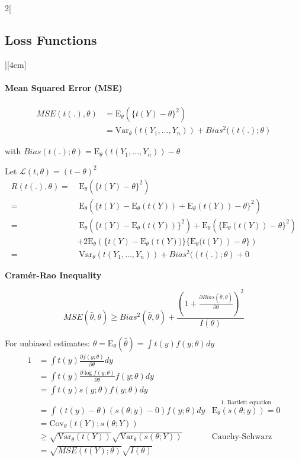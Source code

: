 \documentclass[8pt]{extarticle}
\begin{document}
\begin{multicols}{2}[\subsection{Loss Functions}][4cm]
\paragraph{Mean Squared Error (MSE)}
\begin{align*}
MSE(t(.), \theta) &= \mathrm{E}_\theta\left(\{t(Y)-\theta\}^2\right) \\
&=\mathrm{Var}_\theta\left(t(Y_1,...,Y_n)\right) + Bias^2((t(.); \theta)
\end{align*}

\noindent with $Bias(t(.);\theta) = \mathrm{E}_\theta\left(t(Y_1,...,Y_n)\right)-\theta$

\begin{Proof}
Let $\mathcal{L}(t, \theta) = (t-\theta)^2$
\begin{align*}
R(t(.), \theta) = &\: \mathrm{E}_\theta (\{t(Y) -\theta\}^2) \\
= &\: \mathrm{E}_\theta (\{t(Y) - \mathrm{E}_\theta(t(Y)) + \mathrm{E}_\theta(t(Y))-\theta\}^2) \\
= &\: \mathrm{E}_\theta (\{t(Y) - \mathrm{E}_\theta(t(Y))\}^2) +
\mathrm{E}_\theta (\{\mathrm{E}_\theta(t(Y))-\theta\}^2) \\
& +  2\mathrm{E}_\theta (\{t(Y)-\mathrm{E}_\theta \left(t(Y))\}\{\mathrm{E}_\theta (t(Y)\right)-\theta\}) \\
= &\: \mathrm{Var}_\theta(t(Y_1,...,Y_n)) + Bias^2((t(.); \theta) + 0
\end{align*}
\end{Proof}

\textbf{Cramér-Rao Inequality}

$$MSE(\hat{\theta}, \theta) \geq Bias^2(\hat{\theta},\theta) + 
\frac{\left(1+
\frac{\partial Bias(\hat{\theta}, \theta)}{\partial \theta}
\right)^2}{I(\theta)}$$

\begin{Proof}
For unbiased estimates: $ \theta = \mathrm{E}_\theta(\hat{\theta}) = \int t(y)f(y;\theta)dy$
\begin{align*}
1 &= \int t(y) \frac{\partial f(y;\theta)}{\partial \theta} dy \\
&= \int t(y) \frac{\partial \log f(y;\theta)}{\partial \theta} f(y;\theta) dy \\
&= \int t(y) s(y;\theta) f(y;\theta) dy \\
&= \int \left( t(y)-\theta\right)\left(s(\theta;y)-0\right)f(y;\theta)dy
& \overset{\text{1. Bartlett equation}}{\mathrm{E}_\theta \left(s(\theta;y)\right) = 0}\\
&= \mathrm{Cov}_\theta\left(t(Y);s(\theta;Y)\right) \\
&\geq \sqrt{\mathrm{Var}_\theta(t(Y))} \sqrt{\mathrm{Var}_\theta(s(\theta;Y))} & \text{Cauchy-Schwarz} \\
&= \sqrt{MSE(t(Y);\theta)} \sqrt{I(\theta)}
\end{align*}
\end{Proof}


\end{multicols}
\end{document}
